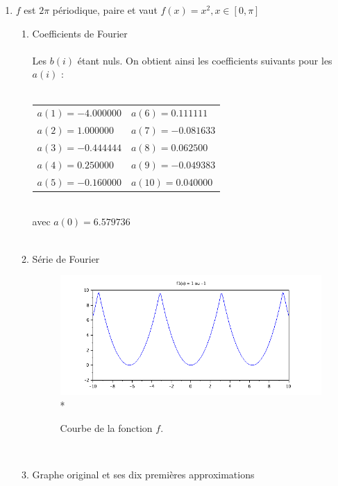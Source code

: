 \documentclass[a4paper,12pt]{report}
\begin{document}
\begin{enumerate}
		\item $f$ est $2\pi$ p\'eriodique, paire et vaut $f(x)=x^{2}, x \in [0,\pi]$ \\
		\begin{enumerate}
			\item Coefficients de Fourier \\ \\
			Les $b(i)$ \'etant nuls. On obtient ainsi les coefficients suivants pour les $a(i)$ : \\ \\
			\begin{tabular}{l l}
				$a(1) = -4.000000$ & \hspace*{2cm}$a(6) = 0.111111$\\
				$a(2) = 1.000000$ & \hspace*{2cm}$a(7) = -0.081633$\\
				$a(3) = -0.444444$ & \hspace*{2cm}$a(8) = 0.062500$\\
				$a(4) = 0.250000$ & \hspace*{2cm}$a(9) = -0.049383$\\
				$a(5) = -0.160000$ & \hspace*{2cm}$a(10) = 0.040000$\\
			\end{tabular}\\
			avec $a(0) = 6.579736$\\ \\
			\item S\'erie de Fourier
			\begin{figure}[h!]
				\centering
				\includegraphics[scale=0.6]{ex1_fig4_0.png}\\*
				\caption{\label{ex1_figure4_0}Courbe de la fonction $f$.}
			\end{figure}\\
			\newpage
			\item Graphe original et ses dix premi\`eres approximations

\end{enumerate}
\end{enumerate}
\end{document}
